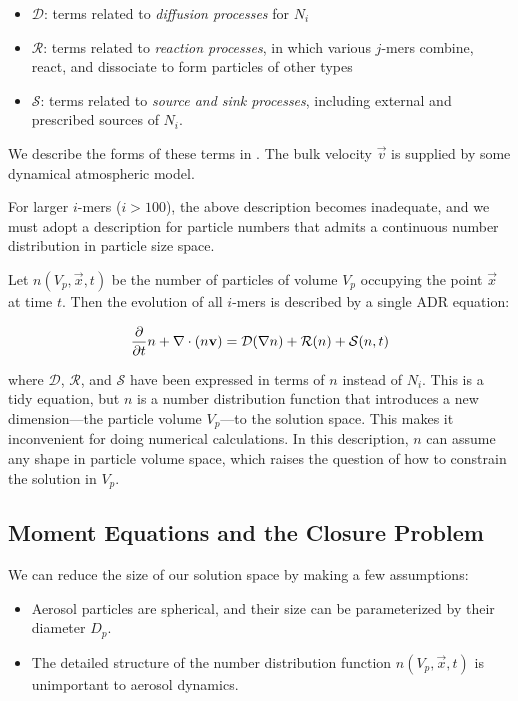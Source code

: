 \begin{itemize}
  \item $\mathcal{D}$: terms related to {\it diffusion processes} for $N_i$
  \item $\mathcal{R}$: terms related to {\it reaction processes}, in which
        various $j$-mers combine, react, and dissociate to form particles of
        other types
  \item $\mathcal{S}$: terms related to {\it source and sink processes},
        including external and prescribed sources of $N_i$.
\end{itemize}

We describe the forms of these terms in . The bulk
velocity $\vec{v}$ is supplied by some dynamical atmospheric model.

For larger $i$-mers ($i > 100$), the above description becomes inadequate, and
we must adopt a description for particle numbers that admits a continuous
number distribution in particle size space.

Let $n(V_p, \vec{x}, t)$ be the number of particles of volume $V_p$ occupying
the point $\vec{x}$ at time $t$. Then the evolution of all $i$-mers is described
by a single ADR equation:

\begin{equation}\labeleq{continuous_dndt}
  \ddt{n} + \div{(n\vec{v})} = \mathcal{D}(\nabla n) +
                               \mathcal{R}(n) +
                               \mathcal{S}(n, t)
\end{equation}

where $\mathcal{D}$, $\mathcal{R}$, and $\mathcal{S}$ have been expressed
in terms of $n$ instead of $N_i$. This is a tidy equation, but $n$ is a
number distribution function that introduces a new dimension---the particle volume
$V_p$---to the solution space. This makes it inconvenient for doing numerical
calculations. In this description, $n$ can assume any shape in particle volume
space, which raises the question of how to constrain the solution in $V_p$.

\subsection*{Moment Equations and the Closure Problem}
We can reduce the size of our solution space by making a few assumptions:

\begin{itemize}
  \item \assume Aerosol particles are spherical, and their size can be
        parameterized by their diameter $D_p$.
  \item \assume The detailed structure of the number distribution function
        $n(V_p, \vec{x}, t)$ is unimportant to aerosol dynamics.
\end{itemize}


